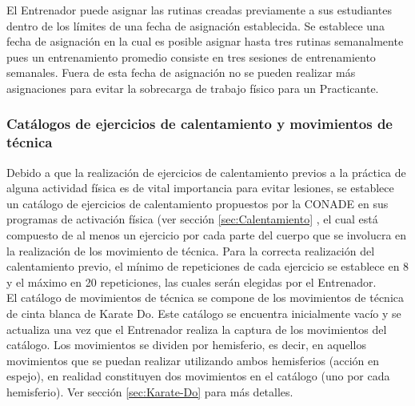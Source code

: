 El Entrenador puede asignar las rutinas creadas previamente a sus estudiantes dentro de los límites de una fecha de asignación establecida. Se establece una fecha de asignación en la cual es posible asignar hasta tres rutinas semanalmente pues un entrenamiento promedio consiste en tres sesiones de entrenamiento semanales. Fuera de esta fecha de asignación no se pueden realizar más asignaciones para evitar la sobrecarga de trabajo físico para un Practicante.\\

\subsubsection{Catálogos de ejercicios de calentamiento y movimientos de técnica}

Debido a que la realización de ejercicios de calentamiento previos a la práctica de alguna actividad física es de vital importancia para evitar lesiones, se establece un catálogo de ejercicios de calentamiento propuestos por la CONADE en sus programas de activación física (ver sección \ref{sec:Calentamiento} , el cual está compuesto de al menos un ejercicio por cada parte del cuerpo que se involucra en la realización de los movimiento de técnica. Para la correcta realización del calentamiento previo, el mínimo de repeticiones de cada ejercicio se establece en 8 y el máximo en 20 repeticiones, las cuales serán elegidas por el Entrenador.\\

El catálogo de movimientos de técnica se compone de los movimientos de técnica de cinta blanca de Karate Do. Este catálogo se encuentra inicialmente vacío y se actualiza una vez que el Entrenador realiza la captura de los movimientos del catálogo. Los movimientos se dividen por hemisferio, es decir, en aquellos movimientos que se puedan realizar utilizando ambos hemisferios (acción en espejo), en realidad constituyen dos movimientos en el catálogo (uno por cada hemisferio). Ver sección \ref{sec:Karate-Do}  para más detalles.\\